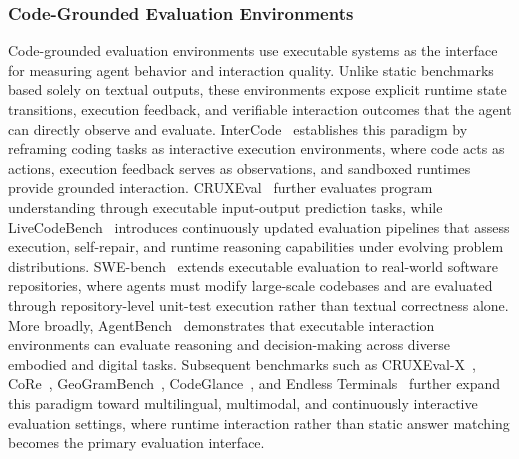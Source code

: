 \documentclass{llmxive}
\begin{document}
\subsubsection{Code-Grounded Evaluation Environments}
Code-grounded evaluation environments use executable systems as
the interface for measuring agent behavior and interaction
quality.
Unlike static benchmarks based solely on textual outputs, these
environments expose explicit runtime state transitions, execution
feedback, and verifiable interaction outcomes that the agent
can directly observe and evaluate.
InterCode~\cite{yang2023intercode} establishes this paradigm by
reframing coding tasks as interactive execution environments,
where code acts as actions, execution feedback serves as
observations, and sandboxed runtimes provide grounded
interaction.
CRUXEval~\cite{gu2024cruxeval} further evaluates program
understanding through executable input-output prediction tasks,
while LiveCodeBench~\cite{jain2024livecodebench} introduces
continuously updated evaluation pipelines that assess execution,
self-repair, and runtime reasoning capabilities under evolving
problem distributions.
SWE-bench~\cite{jimenez2023swe} extends executable evaluation to
real-world software repositories, where agents must modify
large-scale codebases and are evaluated through repository-level
unit-test execution rather than textual correctness alone.
More broadly, AgentBench~\cite{liu2023agentbench} demonstrates
that executable interaction environments can evaluate reasoning
and decision-making across diverse embodied and digital tasks.
Subsequent benchmarks such as
CRUXEval-X~\cite{xu2025cruxeval},
CoRe~\cite{xie2025core},
GeoGramBench~\cite{luo2025geogrambench},
CodeGlance~\cite{wang2026codeglance}, and
Endless Terminals~\cite{gandhi2026endless} further expand this
paradigm toward multilingual, multimodal, and continuously
interactive evaluation settings, where runtime interaction rather
than static answer matching becomes the primary evaluation
interface.
\end{document}
